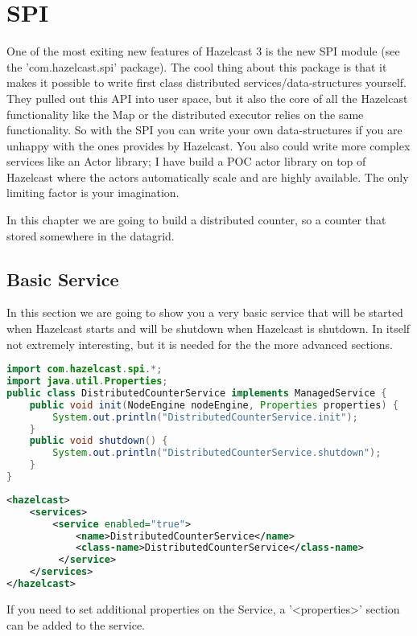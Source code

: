 \chapter{SPI}

One of the most exiting new features of Hazelcast 3 is the new SPI module (see the 'com.hazelcast.spi' package). The cool thing about this package is that it makes it possible to write first class distributed services/data-structures yourself. They pulled out this API into user space, but it also the core of all the Hazelcast functionality like the Map or the distributed executor relies on the same functionality. So with the SPI you can write your own data-structures if you are unhappy with the ones provides by Hazelcast. You also could write more complex services like an Actor library; I have build a POC actor library on top of Hazelcast where the actors automatically scale and are highly available. The only limiting factor is your imagination.

In this chapter we are going to build a distributed counter, so a counter that stored somewhere in the datagrid.

\section{Basic Service}
In this section we are going to show you a very basic service that will be started when Hazelcast starts and will be shutdown when Hazelcast is shutdown. In itself not extremely interesting, but it is needed for the the more advanced sections.

\begin{lstlisting}[language=java]
import com.hazelcast.spi.*;
import java.util.Properties;
public class DistributedCounterService implements ManagedService {
    public void init(NodeEngine nodeEngine, Properties properties) {
        System.out.println("DistributedCounterService.init");
    }
    public void shutdown() {
        System.out.println("DistributedCounterService.shutdown");
    }
}
\end{lstlisting}

\begin{lstlisting}[language=xml]
<hazelcast>
    <services>
        <service enabled="true">
            <name>DistributedCounterService</name>
            <class-name>DistributedCounterService</class-name>
         </service>
    </services>
</hazelcast>
\end{lstlisting}
If you need to set additional properties on the Service, a '<properties>' section can be added to the service.

